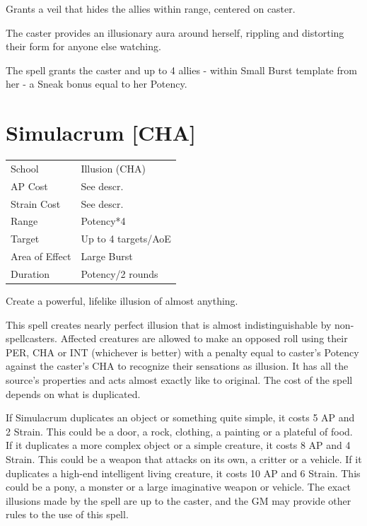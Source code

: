 \documentclass[11pt,a4paper,twocolumn]{book}
\begin{document}
\medskip

Grants a veil that hides the allies within range, centered on caster.

The caster provides an illusionary aura around herself, rippling and distorting their form for anyone else watching.

The spell grants the caster and up to 4 allies - within Small Burst template from her - a Sneak bonus equal to her Potency.

\vfill


\section*{Simulacrum [CHA]}
{
	\begin{tabu} to 75mm{| X[l,4] | X[l,7] |}
		\hline
		School 			& Illusion (CHA) 				\\
        AP Cost	      	& See descr. 					\\
        Strain Cost     & See descr. 					\\
        Range     		& Potency*4						\\
        Target      	& Up to 4 targets/AoE			\\
        Area of Effect  & Large Burst  	 				\\
        Duration     	& Potency/2 rounds		\\ \hline
	\end{tabu}
		
}

\medskip

Create a powerful, lifelike illusion of almost anything.

This spell creates nearly perfect illusion that is almost indistinguishable by non-spellcasters. Affected creatures are allowed to make an opposed roll using their PER, CHA or INT (whichever is better) with a penalty equal to caster's Potency against the caster's CHA to recognize their sensations as illusion. It has all the source's properties and acts almost exactly like to original. The cost of the spell depends on what is duplicated. 

If Simulacrum duplicates an object or something quite simple, it costs 5 AP and 2 Strain. This could be a door, a rock, clothing, a painting or a plateful of food. If it duplicates a more complex object or a simple creature, it costs 8 AP and 4 Strain. This could be a weapon that attacks on its own, a critter or a vehicle. If it duplicates a high-end intelligent living creature, it costs 10 AP and 6 Strain. This could be a pony, a monster or a large imaginative weapon or vehicle. The exact illusions made by the spell are up to the caster, and the GM may provide other rules to the use of this spell.
\end{document}
